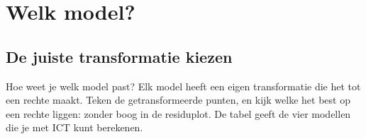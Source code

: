 \section{Welk model?}

\subsection{De juiste transformatie kiezen}

Hoe weet je welk model past? Elk model heeft een eigen transformatie die het tot een rechte maakt. Teken de getransformeerde punten, en kijk welke het best op een rechte liggen: zonder boog in de residuplot. De tabel geeft de vier modellen die je met ICT kunt berekenen.


